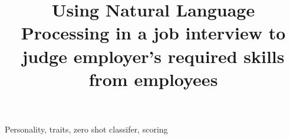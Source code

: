 \documentclass[conference]{IEEEtran}
\begin{document}
\title{Using Natural Language Processing in a job interview to judge employer's required skills from employees}


\author{
}

\maketitle



\begin{IEEEkeywords}
Personality, traits, zero shot classifer, scoring
\end{IEEEkeywords}

\IEEEpeerreviewmaketitle







\appendices





\end{document}
